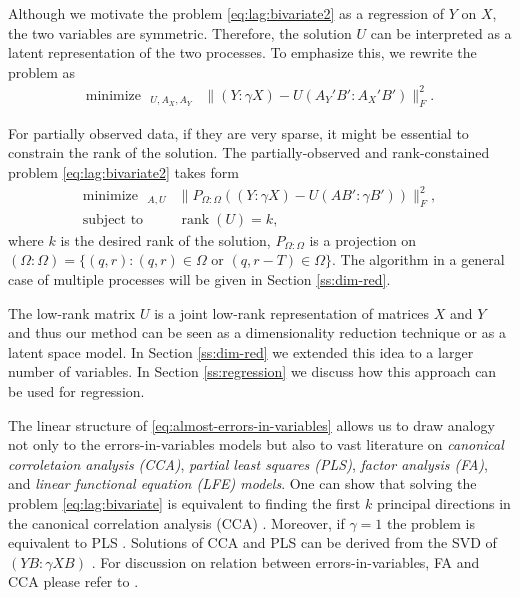 \documentclass[preprint]{imsart}
\numberwithin{equation}{section}
\theoremstyle{plain}
\DeclareMathOperator*{\argmin}{arg\,min}
\DeclareMathOperator*{\rank}{rank}
\DeclareMathOperator*{\minimize}{minimize\ \ }
\DeclareMathOperator*{\subjectto}{subject\ to\ \ }
\begin{document}
Although we motivate the problem \eqref{eq:lag:bivariate2} as a regression of $Y$ on $X$, the two variables are symmetric. Therefore, the solution $U$ can be interpreted as a latent representation of the two processes. To emphasize this, we rewrite the problem as
\begin{align}\label{eq:lag:bivariate2-symmetric}
  \minimize_{U,A_X,A_Y} & \| (Y:\gamma X) - U(A_Y'B':A_X'B') \|_F^2.\nonumber
\end{align}

For partially observed data, if they are very sparse, it might be essential to constrain the rank of the solution. The partially-observed and rank-constained problem \eqref{eq:lag:bivariate2} takes form 
\begin{align*}%
  \minimize_{A,U} & \| P_{\Omega:\Omega}((Y:\gamma X) - U(AB':\gamma B')) \|_F^2,\nonumber\\
  \subjectto & \rank(U) = k,
\end{align*}
where $k$ is the desired rank of the solution, $P_{\Omega:\Omega}$ is a projection on $(\Omega:\Omega) = \{(q,r): (q,r) \in \Omega \text{ or } (q,r-T) \in \Omega\}$. The algorithm in a general case of multiple processes will be given in Section \ref{ss:dim-red}.

The low-rank matrix $U$ is a joint low-rank representation of matrices $X$ and $Y$ and thus our method can be seen as a dimensionality reduction technique or as a latent space model. In Section \ref{ss:dim-red} we extended this idea to a larger number of variables. In Section \ref{ss:regression} we discuss how this approach can be used for regression.

The linear structure of \eqref{eq:almost-errors-in-variables} allows us to draw analogy not only to the errors-in-variables models but also to vast literature on {\em canonical corroletaion analysis (CCA)}, {\em partial least squares (PLS)}, {\em factor analysis (FA)}, and {\em linear functional equation (LFE) models}. One can show that solving the problem \eqref{eq:lag:bivariate} is equivalent to finding the first $k$ principal directions in the canonical correlation analysis (CCA) \citep{hotelling1936relations}. Moreover, if $\gamma=1$ the problem is equivalent to PLS \citep{wold1975soft}. Solutions of CCA and PLS can be derived from the SVD of $(YB:\gamma XB)$ \citep{borga1997unified}. For discussion on relation between errors-in-variables, FA and CCA please refer to \cite{gleser1981}.
\end{document}

